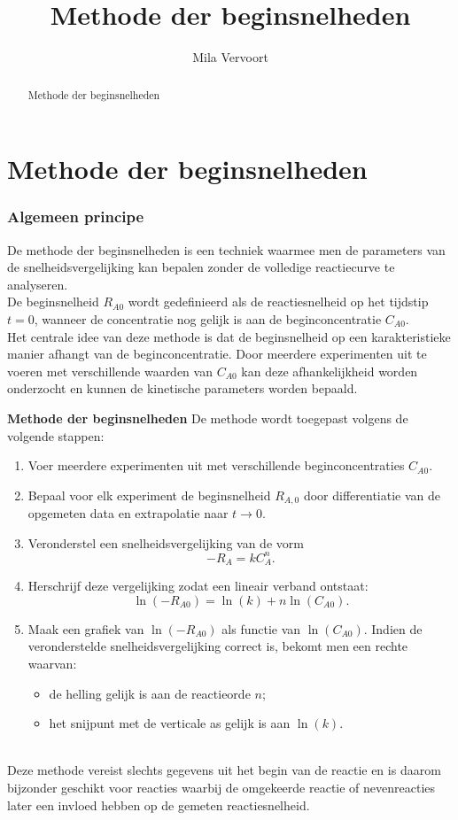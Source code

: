 \documentclass{ximera}
\title{Methode der beginsnelheden}
\author{Mila Vervoort}
\begin{document}
\begin{abstract}
    Methode der beginsnelheden
\end{abstract}
\maketitle
\label{xim:Methode der beginsnelheden}

\section*{Methode der beginsnelheden}
\subsubsection*{Algemeen principe}

De methode der beginsnelheden is een techniek waarmee men de parameters van de snelheidsvergelijking kan bepalen zonder de volledige reactiecurve te analyseren.\\
De beginsnelheid $R_{A0}$ wordt gedefinieerd als de reactiesnelheid op het tijdstip $t=0$, wanneer de concentratie nog gelijk is aan de beginconcentratie $C_{A0}$.\\
Het centrale idee van deze methode is dat de beginsnelheid op een karakteristieke manier afhangt van de beginconcentratie. Door meerdere experimenten uit te voeren met verschillende waarden van $C_{A0}$ kan deze afhankelijkheid worden onderzocht en kunnen de kinetische parameters worden bepaald.

\begin{procedure}
\textbf{Methode der beginsnelheden}
De methode wordt toegepast volgens de volgende stappen:

\begin{enumerate}
    \item Voer meerdere experimenten uit met verschillende beginconcentraties $C_{A0}$.

    \item Bepaal voor elk experiment de beginsnelheid $R_{A,0}$ door differentiatie van de opgemeten data en extrapolatie naar $t \to 0$.

    \item Veronderstel een snelheidsvergelijking van de vorm
    \[
    -R_A = kC_A^n.
    \]

    \item Herschrijf deze vergelijking zodat een lineair verband ontstaat:
    \[
    \ln(-R_{A0})=\ln(k)+n\ln(C_{A0}).
    \]

    \item Maak een grafiek van $\ln(-R_{A0})$ als functie van $\ln(C_{A0})$. Indien de veronderstelde snelheidsvergelijking correct is, bekomt men een rechte waarvan:
    \begin{itemize}
        \item de helling gelijk is aan de reactieorde $n$;
        \item het snijpunt met de verticale as gelijk is aan $\ln(k)$.
    \end{itemize}
\end{enumerate}

\end{procedure}
\text{ } \\

Deze methode vereist slechts gegevens uit het begin van de reactie en is daarom bijzonder geschikt voor reacties waarbij de omgekeerde reactie of nevenreacties later een invloed hebben op de gemeten reactiesnelheid.
\end{document}
